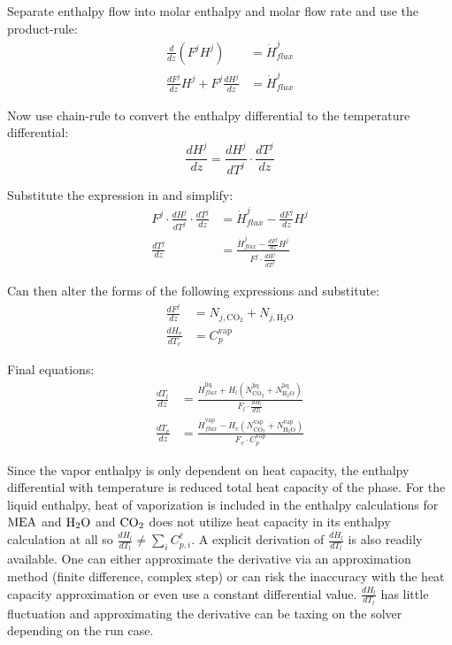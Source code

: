 \documentclass[a4paper,fleqn]{cas-sc}
\newcommand{\COtwo}{{\ce{CO2}}}
\newcommand{\HtwoO}{{\ce{H2O}}}
\newcommand{\MEA}{{\ce{MEA}}}
\newcommand{\liq}{\ell}
\begin{document}
    Separate enthalpy flow into molar enthalpy and molar flow rate and use the product-rule:
    \begin{align}
        \frac{d}{dz}(F^j H^j) &= \dot{H}^{j}_{flux} \\
        \frac{dF^j}{dz} H^j + F^j \frac{dH^j}{dz} &= \dot{H}^{j}_{flux}
    \end{align}

    Now use chain-rule to convert the enthalpy differential to the temperature differential:
    \begin{equation}
        \frac{dH^j}{dz} = \frac{dH^j}{dT^j} \cdot \frac{dT^j}{dz}
    \end{equation}

    Substitute the expression in and simplify:
    \begin{align}
        F^j \cdot \frac{dH^j}{dT^j} \cdot \frac{dT^j}{dz} &= \dot{H}^{j}_{flux} - \frac{dF^j}{dz} H^j \\
        \frac{dT^j}{dz} &= \frac{\dot{H}^{j}_{flux} - \frac{dF^j}{dz} H^j}{F^j \cdot \frac{dH^j}{dT^j}}
    \end{align}

    Can then alter the forms of the following expressions and substitute:
    \begin{align}
        \frac{dF^j}{dz} &= N_{j, \mathrm{CO}_2} + N_{j, \mathrm{H}_2\mathrm{O}} \\
        \frac{dH_v}{dT_v} &= C^{\mathrm{vap}}_{p}
    \end{align}

    Final equations:
    \begin{align}
        \frac{dT_l}{dz} &= \frac{\dot{H}^{\mathrm{liq}}_{flux} +  H_l(N^{\mathrm{liq}}_{\mathrm{CO}_2} + N^{\mathrm{liq}}_{\mathrm{H}_2\mathrm{O}})}{F_l \cdot \frac{dH_l}{dT_l}} \\[1em]
        \frac{dT_v}{dz} &= \frac{\dot{H}^{\mathrm{vap}}_{flux} -  H_v(N^{\mathrm{vap}}_{\mathrm{CO}_2} + N^{\mathrm{vap}}_{\mathrm{H}_2\mathrm{O}})}{F_v \cdot C^{\mathrm{vap}}_{p}}
    \end{align}

    Since the vapor enthalpy is only dependent on heat capacity, the enthalpy differential with temperature is reduced total heat capacity of the phase. For the liquid enthalpy, heat of vaporization is included in the enthalpy calculations for $\MEA$ and $\HtwoO$ and $\COtwo$ does not utilize heat capacity in its enthalpy calculation at all so $\frac{dH_l}{dT_l} \neq \sum _{i} C^{\liq}_{p,i}$. A explicit derivation of $\frac{dH_l}{dT_l}$ is also readily available. One can either approximate the derivative via an approximation method (finite difference, complex step) or can risk the inaccuracy with the heat capacity approximation or even use a constant differential value. $\frac{dH_l}{dT_l}$ has little fluctuation and approximating the derivative can be taxing on the solver depending on the run case.
\end{document}
